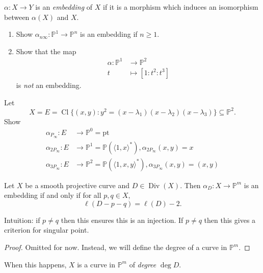 \documentclass[a4paper]{article}
\DeclareMathOperator{\Cl}{Cl}
\renewcommand*{\P}{\mathbb{P}}
\DeclareMathOperator{\Div}{Div} %
\begin{document}
\begin{definition}[embedding]
  \(\alpha: X \to Y\) is an \emph{embedding} of \(X\) if it is a morphism which induces an isomorphism between \(\alpha(X)\) and \(X\).
\end{definition}

\begin{ex}\leavevmode
  \begin{enumerate}
  \item Show \(\alpha_{n \infty}: \P^1 \to \P^n\) is an embedding if \(n \geq 1\).
  \item Show that the map
    \begin{align*}
      \alpha: \P^1 &\to \P^2 \\
      t &\mapsto [1: t^2 : t^3]
    \end{align*}
    is \emph{not} an embedding.
  \end{enumerate}
\end{ex}

\begin{eg}
  Let
  \[
    X = E = \Cl \{(x, y): y^2 = (x - \lambda_1)(x - \lambda_2)(x - \lambda_3)\} \subseteq \P^2.
  \]
  Show
  \begin{align*}
    \alpha_{P_\infty}: E &\to \P^0 = \text{pt} \\
    \alpha_{2 P_\infty}: E &\to \P^1 = \P(\langle 1, x \rangle^*), \alpha_{2 P_\infty} (x, y) = x \\
    \alpha_{3 P_\infty}: E &\to \P^2 = \P(\langle 1, x, y \rangle^*), \alpha_{3P_\infty}(x, y) = (x, y)
  \end{align*}
\end{eg}

\begin{theorem}
  Let \(X\) be a smooth projective curve and \(D \in \Div(X)\). Then \(\alpha_D: X \to \P^m\) is an embedding if and only if for all \(p, q \in X\),
  \[
    \ell(D - p - q) = \ell(D) - 2.
  \]
\end{theorem}
Intuition: if \(p \neq q\) then this ensures this is an injection. If \(p \neq q\) then this gives a criterion for singular point.

\begin{proof}
  Omitted for now. Instead, we will define the degree of a curve in \(\P^m\).
\end{proof}

When this happens, \(X\) is a curve in \(\P^m\) of \emph{degree} \(\deg D\).
\end{document}
